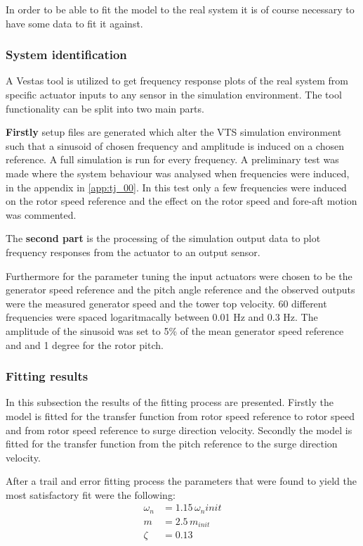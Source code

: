 \medskip
In order to be able to fit the model to the real system it is of course necessary to have some data to fit it against.

\subsubsection*{System identification}
A Vestas tool is utilized to get frequency response plots of the real system from specific actuator inputs to any sensor in the simulation environment. The tool functionality can be split into two main parts. 

\textbf{Firstly} setup files are generated which alter the VTS simulation environment such that a sinusoid of chosen frequency and amplitude is induced on a chosen reference. A full simulation is run for every frequency. A preliminary test was made where the system behaviour was analysed when frequencies were induced, in the appendix in \cref{app:tj_00}. In this test only a few frequencies were induced on the rotor speed reference and the effect on the rotor speed and fore-aft motion was commented.

The \textbf{second part} is the processing of the simulation output data to plot frequency responses from the actuator to an output sensor. 

Furthermore for the parameter tuning the input actuators were chosen to be the generator speed reference and the pitch angle reference and the observed outputs were the measured generator speed and the tower top velocity. 60 different frequencies were spaced logaritmacally between 0.01 Hz and 0.3 Hz. The amplitude of the sinusoid was set to 5\% of the mean generator speed reference and and 1 degree for the rotor pitch. 

\subsubsection*{Fitting results}
In this subsection the results of the fitting process are presented. Firstly the model is fitted for the transfer function from rotor speed reference to rotor speed and from rotor speed reference to surge direction velocity. Secondly the model is fitted for the transfer function from the pitch reference to the surge direction velocity.

\smallskip
After a trail and error fitting process the parameters that were found to yield the most satisfactory fit were the following:
\begin{equation*}
	\begin{split}
		\omega_n &= 1.15 \, \omega_ninit \\
		m 		 &= 2.5 \, m_{init} \\
		\zeta 	 &= 0.13
	\end{split}
\end{equation*}


